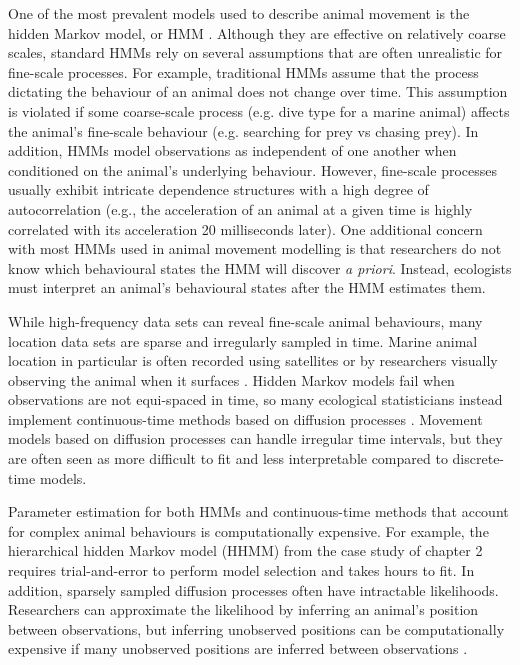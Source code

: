 One of the most prevalent models used to describe animal movement is the hidden Markov model, or HMM \citep{McClintock:2020}. Although they are effective on relatively coarse scales, standard HMMs rely on several assumptions that are often unrealistic for fine-scale processes. For example, traditional HMMs assume that the process dictating the behaviour of an animal does not change over time. This assumption is violated if some coarse-scale process (e.g. dive type for a marine animal) affects the animal's fine-scale behaviour (e.g. searching for prey vs chasing prey). In addition, HMMs model observations as independent of one another when conditioned on the animal's underlying behaviour. However, fine-scale processes usually exhibit intricate dependence structures with a high degree of autocorrelation (e.g., the acceleration of an animal at a given time is highly correlated with its acceleration 20 milliseconds later). One additional concern with most HMMs used in animal movement modelling is that researchers do not know which behavioural states the HMM will discover \textit{a priori}. Instead, ecologists must interpret an animal's behavioural states after the HMM estimates them.

While high-frequency data sets can reveal fine-scale animal behaviours, many location data sets are sparse and irregularly sampled in time. Marine animal location in particular is often recorded using satellites \citep{Gryba:2019} or by researchers visually observing the animal when it surfaces \citep{Hartman:2020}. Hidden Markov models fail when observations are not equi-spaced in time, so many ecological statisticians instead implement continuous-time methods based on diffusion processes \citep{Blackwell:2016, Michelot:2019b}. Movement models based on diffusion processes can handle irregular time intervals, but they are often seen as more difficult to fit and less interpretable compared to discrete-time models.

Parameter estimation for both HMMs and continuous-time methods that account for complex animal behaviours is computationally expensive. For example, the hierarchical hidden Markov model (HHMM) from the case study of chapter 2 requires trial-and-error to perform model selection and takes hours to fit. In addition, sparsely sampled diffusion processes often have intractable likelihoods. Researchers can approximate the likelihood by inferring an animal's position between observations, but inferring unobserved positions can be computationally expensive if many unobserved positions are inferred between observations \citep{Lindstrom:2012}.


